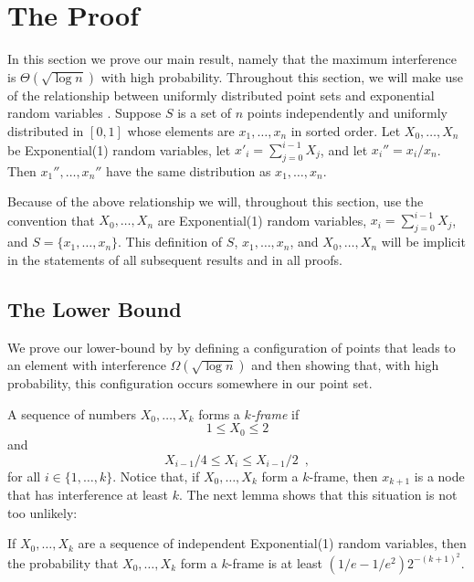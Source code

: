\documentclass{patmorin}
\begin{document}
\section{The Proof}

In this section we prove our main result, namely that the maximum
interference is $\Theta(\sqrt{\log n})$ with high probability.
Throughout this section, we will make use of the relationship between
uniformly distributed point sets and exponential random variables
\cite[Chapter~V, Theorem~2.2]{d86}.  Suppose $S$ is a set of $n$ points
independently and uniformly distributed in $[0,1]$ whose elements are
$x_1,\ldots,x_n$ in sorted order.  Let $X_0,\ldots,X_n$ be Exponential(1)
random variables, let $x'_i=\sum_{j=0}^{i-1}X_j$, and let $x_i''=x_i/x_n$.
Then $x_1'',\ldots,x_n''$ have the same distribution as $x_1,\ldots,x_n$.

Because of the above relationship we will, throughout this section, use
the convention that $X_0,\ldots,X_n$ are Exponential(1) random variables,
$x_i=\sum_{j=0}^{i-1}X_j$, and $S=\{x_1,\ldots,x_n\}$.  This definition
of $S$, $x_1,\ldots,x_n$, and $X_0,\ldots,X_n$ will be implicit in the
statements of all subsequent results and in all proofs.

\subsection{The Lower Bound}

We prove our lower-bound by by defining a configuration of points that
leads to an element with interference $\Omega(\sqrt{\log n})$ and then
showing that, with high probability, this configuration occurs somewhere
in our point set.

A sequence of numbers $X_0,\ldots,X_k$ forms a \emph{$k$-frame} if
\[
     1 \le X_0 \le 2
\]
and
\[
     X_{i-1}/4 \le X_i \le X_{i-1}/2 \enspace ,
\]
for all $i\in\{1,\ldots,k\}$.  Notice that, if $X_0,\ldots,X_k$ form a
$k$-frame, then $x_{k+1}$ is a node that has interference at least $k$.
The next lemma shows that this situation is not too unlikely:

\begin{lem}
If $X_0,\ldots,X_k$ are a sequence of independent Exponential(1) random
variables, then the probability that $X_0,\ldots,X_k$ form a $k$-frame
is at least $(1/e-1/e^2)2^{-(k+1)^2}$.
\end{lem}
\end{document}
